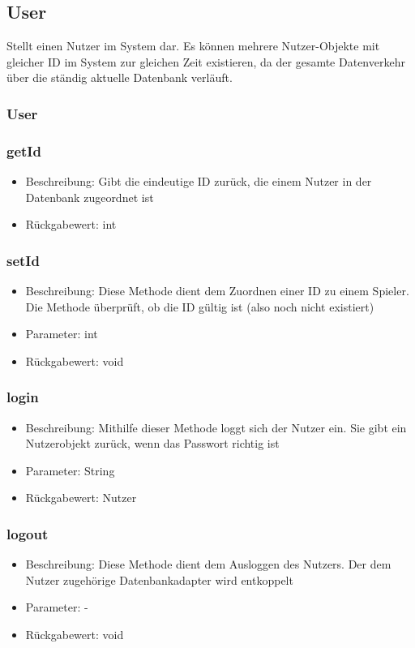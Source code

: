 \documentclass[a4paper]{scrreprt}
\begin{document}
	\subsection{User}
	Stellt einen Nutzer im System dar. Es können mehrere Nutzer-Objekte mit gleicher ID im System zur gleichen Zeit existieren, da der gesamte Datenverkehr über die ständig aktuelle Datenbank verläuft.
		\subsubsection{User}
		\subsubsection{getId}
		\begin{itemize}
			\item Beschreibung: Gibt die eindeutige ID zurück, die einem Nutzer in der Datenbank zugeordnet ist
			\item Rückgabewert: int
		\end{itemize}
		\subsubsection{setId}
		\begin{itemize}
			\item Beschreibung: Diese Methode dient dem Zuordnen einer ID zu einem Spieler. Die Methode überprüft, ob die ID gültig ist (also noch nicht existiert)
			\item Parameter: int
			\item Rückgabewert: void
		\end{itemize}
		\subsubsection{login}
		\begin{itemize}
			\item Beschreibung: Mithilfe dieser Methode loggt sich der Nutzer ein. Sie gibt ein Nutzerobjekt zurück, wenn das Passwort richtig ist
			\item Parameter: String
			\item Rückgabewert: Nutzer
		\end{itemize}
		\subsubsection{logout}
		\begin{itemize}
			\item Beschreibung: Diese Methode dient dem Ausloggen des Nutzers. Der dem Nutzer zugehörige Datenbankadapter wird entkoppelt
			\item Parameter: -
			\item Rückgabewert: void
		\end{itemize}
\end{document}
